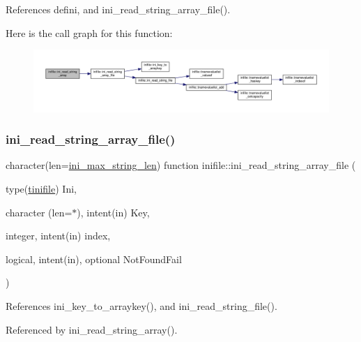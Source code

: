 References defini, and ini\+\_\+read\+\_\+string\+\_\+array\+\_\+file().

Here is the call graph for this function\+:
\nopagebreak
\begin{figure}[H]
\begin{center}
\leavevmode
\includegraphics[width=350pt]{namespaceinifile_af85df5c619b25702ba2acfebf00f3c60_cgraph}
\end{center}
\end{figure}
\mbox{\label{namespaceinifile_a99383bb07cc01af1876a178e4c55a8e5}} 
\subsubsection{\texorpdfstring{ini\+\_\+read\+\_\+string\+\_\+array\+\_\+file()}{ini\_read\_string\_array\_file()}}
{\footnotesize\ttfamily character(len=\mbox{\hyperlink{namespaceinifile_a32faebf83b580d14b5af965dcb4eebfd}{ini\+\_\+max\+\_\+string\+\_\+len}}) function inifile\+::ini\+\_\+read\+\_\+string\+\_\+array\+\_\+file (\begin{DoxyParamCaption}\item[{type(\mbox{\hyperlink{structinifile_1_1tinifile}{tinifile}})}]{Ini,  }\item[{character (len=$\ast$), intent(in)}]{Key,  }\item[{integer, intent(in)}]{index,  }\item[{logical, intent(in), optional}]{Not\+Found\+Fail }\end{DoxyParamCaption})}



References ini\+\_\+key\+\_\+to\+\_\+arraykey(), and ini\+\_\+read\+\_\+string\+\_\+file().



Referenced by ini\+\_\+read\+\_\+string\+\_\+array().

